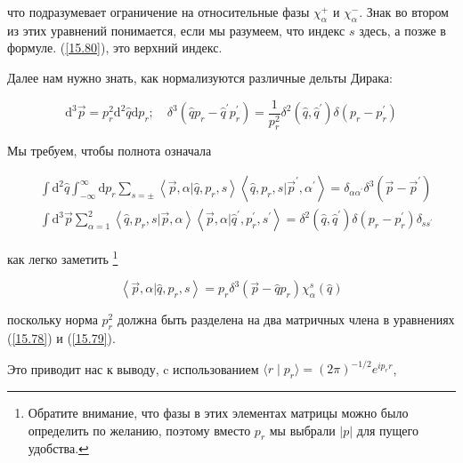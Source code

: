 \documentclass[main.tex]{subfiles}
\begin{document}
что подразумевает ограничение на относительные фазы $\chi_\alpha^+$ и $\chi_\alpha^-$. Знак во втором из этих уравнений понимается, если мы разумеем, что индекс $s$ здесь, а позже в формуле. (\ref{15.80}), это верхний индекс.

Далее нам нужно знать, как нормализуются различные дельты Дирака:

\begin{equation}\label{15.77}
	\mathrm{d}^{3} \vec{p}=p_{r}^{2} \mathrm{d}^{2} \hat{q} \mathrm{d} p_{r} ; \quad \delta^{3}\left(\hat{q} p_{r}-\hat{q}^{\prime} p_{r}^{\prime}\right)=\frac{1}{p_{r}^{2}} \delta^{2}\left(\hat{q}, \hat{q}^{\prime}\right) \delta\left(p_{r}-p_{r}^{\prime}\right)
\end{equation}

Мы требуем, чтобы полнота означала

\begin{equation}\label{15.78}
	\begin{aligned}
&\int \mathrm{d}^{2} \hat{q} \int_{-\infty}^{\infty} \mathrm{d} p_{r} \sum_{s=\pm}\left\langle\vec{p}, \alpha | \hat{q}, p_{r}, s\right\rangle\left\langle\hat{q}, p_{r}, s | \vec{p}^{\prime}, \alpha^{\prime}\right\rangle=\delta_{\alpha \alpha^{\prime}} \delta^{3}\left(\vec{p}-\vec{p}^{\prime}\right)\\
&\int \mathrm{d}^{3} \vec{p} \sum_{\alpha=1}^{2}\left\langle\hat{q}, p_{r}, s | \vec{p}, \alpha\right\rangle\left\langle\vec{p}, \alpha | \hat{q}^{\prime}, p_{r}^{\prime}, s^{\prime}\right\rangle=\delta^{2}\left(\hat{q}, \hat{q}^{\prime}\right) \delta\left(p_{r}-p_{r}^{\prime}\right) \delta_{s s^{\prime}}
\end{aligned}
\end{equation}

как легко заметить \footnote{Обратите внимание, что фазы в этих элементах матрицы можно было определить по желанию, поэтому вместо $p_r$ мы выбрали $|p|$  для пущего удобства.}

\begin{equation}\label{15.80}
	\left\langle\vec{p}, \alpha | \hat{q}, p_{r}, s\right\rangle= p_{r} \delta^{3}\left(\vec{p}-\hat{q} p_{r}\right) \chi_{\alpha}^{s}(\hat{q})
\end{equation}
            
поскольку норма $p_r^2$ должна быть разделена на два матричных члена в уравнениях (\ref{15.78}) и (\ref{15.79}).

Это приводит нас к выводу, c использованием $\langle r \mid p_r \rangle = (2\pi)^{-1/2}e^{ip_r r}$,
\end{document}
